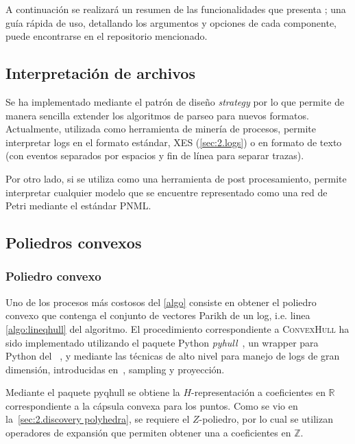 A continuación se realizará un resumen de las funcionalidades que presenta \pachtool;
una guía rápida de uso, detallando los argumentos y opciones de cada componente,
puede encontrarse en el repositorio mencionado.

\subsection{Interpretación de archivos}
\label{sec:4.parsing}

Se ha implementado mediante el patrón de diseño \textit{strategy} por lo que permite
de manera sencilla extender los algoritmos de parseo para nuevos formatos.
Actualmente, utilizada como herramienta de minería de procesos, permite interpretar 
logs en el formato estándar, XES (\autoref{sec:2.logs}) o en formato de texto (con eventos
separados por espacios y fin de línea para separar trazas).

Por otro lado, si se utiliza \pachtool como una herramienta de post procesamiento, 
permite interpretar cualquier modelo que se encuentre representado
como una red de Petri mediante el estándar PNML.

\subsection{Poliedros convexos}
\label{sec:4.convex_polyhedra}


\subsubsection{Poliedro convexo}
\label{sec:4.qhull}

Uno de los procesos más costosos del \autoref{algo} consiste en obtener el poliedro convexo que contenga 
el conjunto de vectores Parikh de un log, i.e. linea \ref{algo:lineqhull} del algoritmo.
El procedimiento correspondiente a \textsc{ConvexHull} ha sido implementado utilizando el paquete Python \emph{pyhull}~\cite{pyhull}, 
un wrapper para Python del \qhulltool~\cite{Barber96}, y mediante las técnicas de alto nivel para manejo de 
logs de gran dimensión, introducidas en~\cite{CarmonaC14}, sampling y proyección.

Mediante el paquete pyqhull se obtiene la $H$-representación a coeficientes en $\mathbb{R}$ correspondiente a la cápsula convexa
para los puntos. Como se vio en la~\autoref{sec:2.discovery polyhedra}, se requiere el $Z$-poliedro,
por lo cual se utilizan operadores de expansión que permiten obtener una  a coeficientes en $\mathbb{Z}$.

